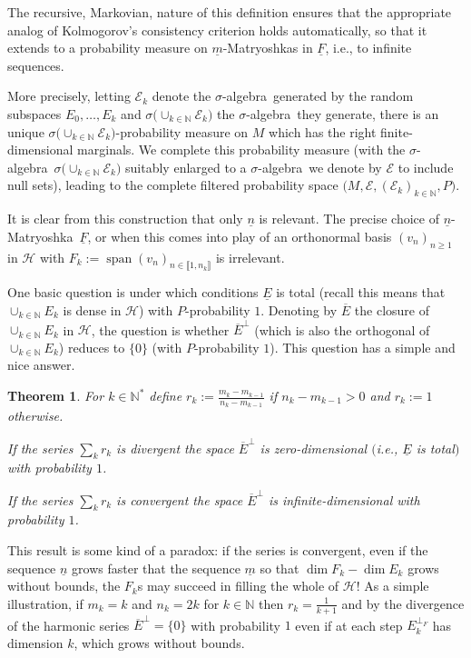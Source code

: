 \documentclass[pdftex]{sigma}%
\DeclareMathOperator{\psan}{span}
\newcommand{\hilH}{\mathcal H}
\newcommand{\kN}{k\in \mathbb{N}}
\newcommand{\intt}[1]{\llbracket #1 \rrbracket}
\newcommand{\perpF}{{\perp _F}}
\newcommand{\algE}{{\mathcal E}}
\newcommand{\salg}{$\sigma$-algebra}
\newtheorem{Theorem}{Theorem}[section]
\begin{document}
The recursive, Markovian, nature of this definition ensures that the appropriate analog of Kolmogorov's consistency criterion holds automatically, so that it extends to a probability measure on $\underline{m}$-Matryoshkas in $\underline{F}$, i.e., to infinite sequences.

More precisely, letting $\algE_k$ denote the \salg\ generated by the random subspaces $E_0,\dots,E_k$ and $\sigma \big(\cup_{\kN} \algE_k\big)$ the \salg\ they generate, there is an unique $\sigma \big(\cup_{\kN} \algE_k\big)$-probability measure on $M$ which has the right finite-dimensional marginals. We complete this probability measure \big(with the \salg\ $\sigma \big(\cup_{\kN} \algE_k\big)$ suitably enlarged to a \salg\ we denote by $\algE$ to include null sets\big), leading to the complete filtered probability space $\big(M,\algE, (\algE_k)_{\kN},P\big)$.

It is clear from this construction that only $\underline{n}$ is relevant. The precise choice of $\underline{n}$-Matryo\-shka~$\underline{F}$, or when this comes into play of an orthonormal basis $(v_n)_{n\geq 1}$ in $\hilH$ with $F_k:=\psan (v_n)_{n\in \intt{1,n_k}}$ is irrelevant.




One basic question is under which conditions $\underline{E}$ is total \big(recall this means that $\cup_{\kN}E_k$ is dense in $\hilH$\big) with $P$-probability $1$. Denoting by $\overline{E}$ the closure of $\cup_{\kN}E_k$ in $\hilH$, the question is whether $\overline{E}^\perp$ \big(which is also the orthogonal of $\cup_{\kN}E_k$\big) reduces to $\{0\}$ (with $P$-probability $1$). This question has a simple and nice answer.

\begin{Theorem} \label{theo:maindense}
For $\kN^*$ define $r_k:=\frac{m_k-m_{k-1}}{n_{k}-m_{k-1}}$ if $n_{k}-m_{k-1}>0$ and $r_k:=1$ otherwise.

 If the series $\sum_k r_k$ is divergent the space $\overline{E}^\perp$ is zero-dimensional $($i.e., $\underline{E}$ is total$)$ with pro\-ba\-bility $1$.

 If the series $\sum_k r_k$ is convergent the space $\overline{E}^\perp$ is infinite-dimensional with probability $1$.
\end{Theorem}

This result is some kind of a paradox: if the series is convergent, even if the sequence $\underline{n}$ grows faster that the sequence $\underline{m}$ so that $\dim F_k-\dim E_k$ grows without bounds, the $F_k$s may succeed in filling the whole of $\hilH$! As a simple illustration, if $m_k=k$ and $n_k=2k$ for $\kN$ then $r_k=\frac{1}{k+1}$ and by the divergence of the harmonic series $\overline{E}^\perp=\{0\}$ with probability $1$ even if at each step $E_k^\perpF$ has dimension $k$, which grows without bounds.
\end{document}
